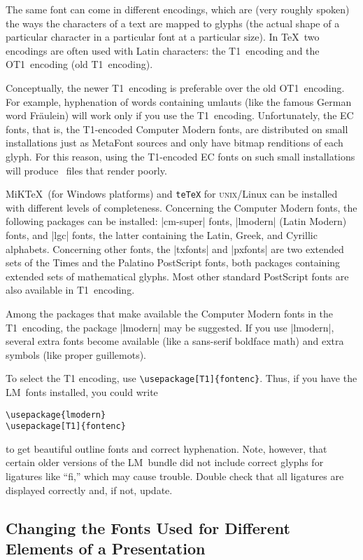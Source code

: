 The same font can come in different encodings, which are (very roughly
spoken) the ways the characters of a text are mapped to glyphs (the
actual shape of a particular character in a particular font at a
particular size). In \TeX\ two encodings are often used with Latin
characters: the T1~encoding and the OT1~encoding (old T1~encoding).

Conceptually, the newer T1~encoding is preferable over the old
OT1~encoding. For example, hyphenation of words containing umlauts
(like the famous German word Fr\"aulein) will work only if you use the
T1~encoding. Unfortunately, the EC fonts, that is, the T1-encoded
Computer Modern fonts, are distributed on small installations just as
MetaFont sources and only have bitmap renditions of each glyph. For
this reason, using the T1-encoded EC fonts on such small installations
will produce \pdf\ files that render poorly.

MiK\TeX\ (for Windows platforms) and \texttt{teTeX} for
\textsc{unix}\slash Linux can be installed with different levels of 
completeness. Concerning the Computer Modern fonts, the following
packages can be installed: |cm-super| fonts, |lmodern| (Latin Modern)
fonts, and |lgc| fonts, the latter containing the Latin, Greek, and
Cyrillic alphabets. Concerning other fonts,  the |txfonts| and
|pxfonts| are two extended sets of the Times and the Palatino
PostScript fonts, both packages containing extended sets of
mathematical glyphs. Most other standard PostScript fonts are also
available in T1~encoding.

Among the packages that make available the Computer Modern fonts in the
T1~encoding, the package |lmodern| may be suggested. If you use
|lmodern|, several extra fonts become available (like a sans-serif
boldface math) and extra symbols (like proper guillemots).

To select the T1 encoding, use \verb|\usepackage[T1]{fontenc}|. Thus, if you
have the LM~fonts installed, you could write
\begin{verbatim}
\usepackage{lmodern}
\usepackage[T1]{fontenc}
\end{verbatim}
to get beautiful outline fonts and correct hyphenation. Note, however, that
certain older versions of the LM~bundle did not include correct glyphs
for ligatures like ``fi,'' which may cause trouble. Double check
that all ligatures are displayed correctly and, if not, update.




\subsection{Changing the Fonts Used for Different Elements of a Presentation}

